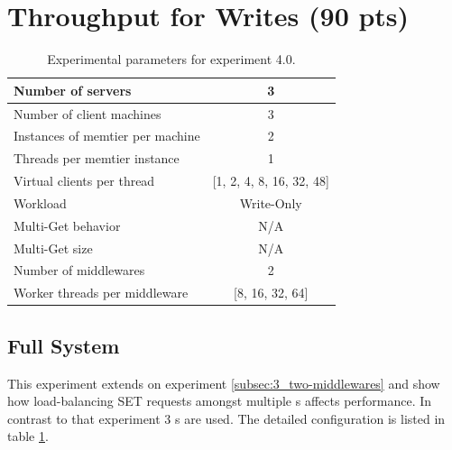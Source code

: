 \section{Throughput for Writes (90 pts)\label{sec:4}}

    \begin{table}
        \scriptsize{
            \begin{tabular}{|l|c|}
                \hline Number of servers                & 3 \\
                \hline Number of client machines        & 3 \\
                \hline Instances of memtier per machine & 2 \\
                \hline Threads per memtier instance     & 1 \\
                \hline Virtual clients per thread       & [1, 2, 4, 8, 16, 32, 48] \\
                \hline Workload                         & Write-Only \\
                \hline Multi-Get behavior               & N/A \\
                \hline Multi-Get size                   & N/A \\
                \hline Number of middlewares            & 2 \\
                \hline Worker threads per middleware    & [8, 16, 32, 64]  \\
                \hline
            \end{tabular}
            \caption{Experimental parameters for experiment 4.0.\label{tab:40_setup}}
        }
    \end{table}

    \subsection{Full System\label{subsec:4_full-system}}
        This experiment extends on experiment \ref{subsec:3_two-middlewares} and show how load-balancing SET requests
        amongst multiple \srv{}s affects performance. In contrast to that experiment 3 \srv{}s are used. The detailed
        configuration is listed in table \ref{tab:40_setup}.

